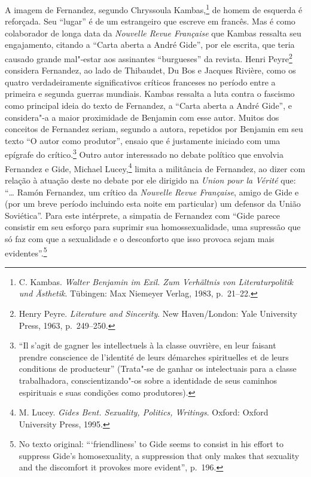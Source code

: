 A imagem de Fernandez, segundo Chryssoula Kambas,\footnote{C. Kambas.
  \emph{Walter Benjamin im Exil. Zum Verhältnis von Literaturpolitik und
  Ästhetik}. Tübingen: Max Niemeyer Verlag, 1983, p.~21--22.} de homem de
esquerda é reforçada. Seu ``lugar'' é de um estrangeiro que escreve em
francês. Mas é como colaborador de longa data da \emph{Nouvelle Revue
Française} que Kambas ressalta seu engajamento, citando a ``Carta aberta
a André Gide'', por ele escrita, que teria causado grande mal"-estar aos
assinantes ``burgueses'' da revista. Henri Peyre\footnote{Henry Peyre.
  \emph{Literature and Sincerity}. New Haven/London: Yale University
  Press, 1963, p.~249--250.} considera Fernandez, ao lado de Thibaudet, Du
Bos e Jacques Rivière, como os quatro verdadeiramente significativos
críticos franceses no período entre a primeira e segunda guerras
mundiais. Kambas ressalta a luta contra o fascismo como principal ideia do
texto de Fernandez, a ``Carta aberta a André Gide'', e considera"-a a
maior proximidade de Benjamin com esse autor. Muitos dos conceitos de
Fernandez seriam, segundo a autora, repetidos por Benjamin em seu texto
``O autor como produtor'', ensaio que é justamente iniciado com uma
epígrafe do crítico.\footnote{``Il s'agit de gagner les intellectuels à
  la classe ouvrière, en leur faisant prendre conscience de l'identité
  de leurs démarches spirituelles et de leurs conditions de producteur''
  (Trata"-se de ganhar os intelectuais para a classe trabalhadora,
  conscientizando"-os sobre a identidade de seus caminhos espirituais e
  suas condições como produtores).} Outro autor interessado no debate
político que envolvia Fernandez e Gide, Michael Lucey,\footnote{M.
  Lucey. \emph{Gides Bent. Sexuality, Politics, Writings}. Oxford:
  Oxford University Press, 1995.} limita a militância de Fernandez, ao
dizer com relação à atuação deste no debate por ele dirigido na \emph{Union
pour la Vérité} que: ``\ldots{} Ramón Fernandez, um crítico da \emph{Nouvelle
Revue Française}, amigo de Gide e (por um breve período incluindo esta
noite em particular) um defensor da União Soviética''. Para este
intérprete, a simpatia de Fernandez com ``Gide parece consistir em seu
esforço para suprimir sua homossexualidade, uma supressão que só faz com
que a sexualidade e o desconforto que isso provoca sejam mais
evidentes''.\footnote{No texto original: ```friendliness' to Gide seems
  to consist in his effort to suppress Gide's homosexuality, a
  suppression that only makes that sexuality and the discomfort it
  provokes more evident'', p.~196.}


